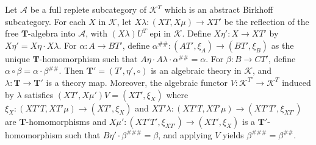Let $\mathcal{A}$ be a full replete subcategory of $\mathcal{K}^T$ which is an abstract Birkhoff subcategory. For each $X$ in $\mathcal{K}$, let $X\lambda: (XT, X\mu) \longrightarrow XT'$ be the reflection of the free $\mathbf{T}$-algebra into $\mathcal{A}$, with $(X\lambda)U^T$ epi in $\mathcal{K}$. Define $X\eta': X \longrightarrow XT'$ by $X\eta' = X\eta \cdot X\lambda$. For $\alpha: A \longrightarrow BT'$, define $\alpha^{\#\#}: (AT', \xi_A) \longrightarrow (BT', \xi_B)$ as the unique $\mathbf{T}$-homomorphism such that $A\eta \cdot A\lambda \cdot \alpha^{\#\#} = \alpha$. For $\beta: B \longrightarrow CT'$, define $\alpha \circ \beta = \alpha \cdot \beta^{\#\#}$. Then $\mathbf{T}' = (T', \eta', \circ)$ is an algebraic theory in $\mathcal{K}$, and $\lambda: \mathbf{T} \longrightarrow \mathbf{T}'$ is a theory map. Moreover, the algebraic functor $V: \mathcal{K}^{T'} \longrightarrow \mathcal{K}^T$ induced by $\lambda$ satisfies $(XT', X\mu')V = (XT', \xi_X)$ where $\xi_X: (XT'T, XT'\mu) \longrightarrow (XT', \xi_X)$ and $XT'\lambda: (XT'T, XT'\mu) \longrightarrow (XT'T', \xi_{XT'})$ are $\mathbf{T}$-homomorphisms and $X\mu': (XT'T', \xi_{XT'}) \longrightarrow (XT', \xi_X)$ is a $\mathbf{T}'$-homomorphism such that $B\eta' \cdot \beta^{\#\#\#} = \beta$, and applying $V$ yields $\beta^{\#\#\#} = \beta^{\#\#}$.
